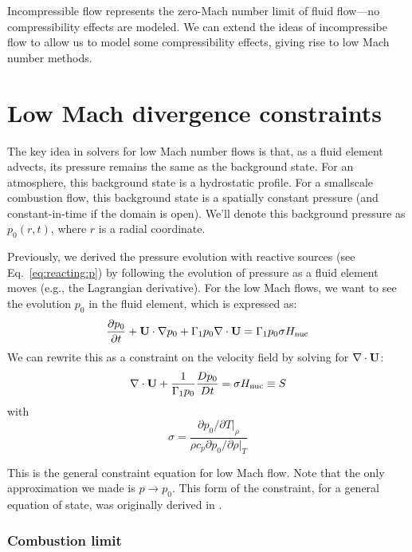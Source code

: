 \newcommand{\teta}{\tilde{\eta}}

Incompressible flow represents the zero-Mach number limit of fluid
flow---no compressibility effects are modeled.  We can extend the
ideas of incompressibe flow to allow us to model some compressibility
effects, giving rise to low Mach number methods.

\section{Low Mach divergence constraints}
\label{ch:lm:constraints}

The key idea in solvers for low Mach number flows is that, as a fluid
element advects, its pressure remains the same as the background
state.  For an atmosphere, this background state is a hydrostatic
profile.  For a smallscale combustion flow, this background state is a
spatially constant pressure (and constant-in-time if the domain is
open).  We'll denote this background pressure as $p_0(r,t)$, where 
$r$ is a radial coordinate.

Previously, we derived the pressure evolution with reactive sources
(see Eq.~\ref{eq:reacting:p}) by following the evolution of pressure
as a fluid element moves (e.g., the Lagrangian derivative).  For the 
low Mach flows, we want to see the evolution $p_0$ in the fluid
element, which is expressed as:
\begin{equation}
{\frac{{\partial p_0}}{\partial t}} + {\bf U} \cdot \nabla p_0 + \Gamma_1 p_0 \nabla \cdot {\bf U} = \Gamma_1 p_0 \sigma {H_\mathrm{nuc}}
\end{equation}
We can rewrite this as a constraint on the velocity field by solving for $\nabla \cdot {\bf U}$:
\begin{equation}
  \nabla \cdot {\bf U} + \frac{1}{\Gamma_1 p_0}\frac{Dp_0}{Dt} = \sigma {H_\mathrm{nuc}} \equiv S
\end{equation}
with
\begin{equation}
\sigma = \frac{\partial p_0/\partial T |_\rho}{\rho c_p \partial p_0/\partial \rho |_T}
\end{equation}

This is the general constraint equation for low Mach flow.  Note that the
only approximation we made is $p \rightarrow p_0$.  This form of the constraint,
for a general equation of state, was originally derived in \cite{ABRZ:I}.  

\subsubsection{Combustion limit}

